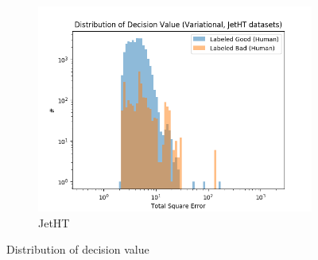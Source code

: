\begin{figure}[h!]
\begin{subfigure}[b]{0.49\linewidth}
        \includegraphics[width=\linewidth]{images/reco/2018/feature_2/se_dist_Variational1f2_JetHT.png}
        \caption{JetHT}
    \end{subfigure}
    \caption{Distribution of decision value}
\label{fig:2018_f2_se_dist}
\end{figure}